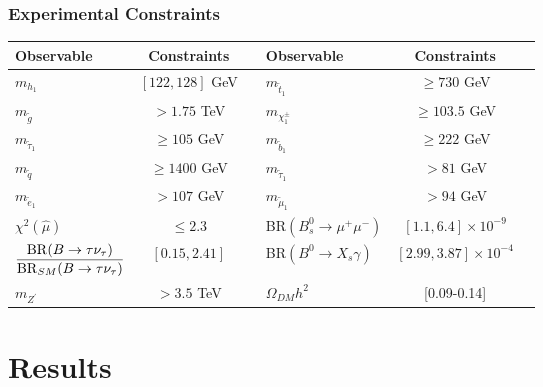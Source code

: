 \documentclass[hyperref={bookmarks=false},aspectratio=169]{beamer}
\begin{document}
\begin{frame}
\frametitle{Experimental Constraints}

{\small \begin{table}{
		\setlength\tabcolsep{7pt}
		\renewcommand{\arraystretch}{1.6}
		\begin{tabular}{l|c|c|l|c|c}
			Observable & Constraints &  & Observable & Constraints & \\
			\hline
			$m_{h_1} $ & $ [122,128] $ GeV                                &  &
			$m_{\widetilde{t}_1} $                                 & $ \geqslant 730 $ GeV & \\
			$m_{\widetilde{g}} $                                     & $ > 1.75 $ TeV & &
			$ m_{\chi_1^\pm} $                                    & $ \geqslant 103.5 $ GeV &  \\
			$m_{\widetilde{\tau}_1} $                                & $ \geqslant 105 $ GeV &  & 
			$m_{\widetilde{b}_1} $                                 & $ \geqslant 222 $ GeV & \\
			$m_{\widetilde{q}} $                                     & $ \geqslant 1400 $ GeV & &
			$m_{\widetilde{\tau}_1} $                              & $ > 81 $ GeV &  \\
			$m_{\widetilde{e}_1} $                                   & $ > 107 $ GeV &  &
			$m_{\widetilde{\mu}_1} $                               & $ > 94 $ GeV &  \\
			$\chi^2(\hat{\mu})$                                    & $\leq 2.
			3 $ &  &
			BR$(B^0_s \to \mu^+\mu^-) $ & $[1.1,6.4] \times 10^{-9}$  &
			 \\ 
			$\displaystyle  \frac{{\rm BR}(B \to \tau\nu_\tau)}
			{{\rm BR}_{SM}(B \to \tau\nu_\tau)} $ & $ [0.15,2.41] $ &
			 &
			BR$(B^0 \to X_s \gamma) $ & $  [2.99,3.87]\times10^{-4} $ &
			\\
			$m_{Z^{\prime}} $                                        & $ > 3.5 $ TeV & &
			$\Omega_{DM}h^{2} $                                            &  [0.09-0.14] &                       \\  
		\end{tabular}
		 }
\end{table}}

\end{frame}







\section{Results}
\end{document}
